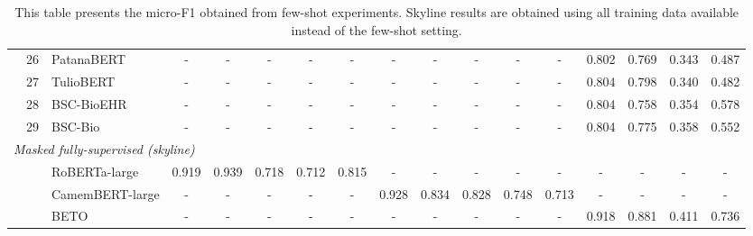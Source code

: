 \begin{table*}[ht]
{{\begin{tabular}{lll|ccccc|ccccc|cccc}
 & 26 & PatanaBERT & - & - & - & - & - & - & - & - & - & - & 0.802 & 0.769 & 0.343 & 0.487 \\
 & 27 & TulioBERT & - & - & - & - & - & - & - & - & - & - & 0.804 & 0.798 & 0.340 & 0.482 \\
 & 28 & BSC-BioEHR & - & - & - & - & - & - & - & - & - & - & 0.804 & 0.758 & 0.354 & 0.578 \\
 & 29 & BSC-Bio & - & - & - & - & - & - & - & - & - & - & 0.804 & 0.775 & 0.358 & 0.552 \\
\midrule
\midrule
\multicolumn{17}{l}{\textit{Masked fully-supervised (skyline)}} \\
\midrule
 & & RoBERTa-large & 0.919 & 0.939 & 0.718 & 0.712 & 0.815 & - & - & - & - & - & - & - & - & - \\
 & & CamemBERT-large & - & - & - & - & - & 0.928 & 0.834 & 0.828 & 0.748 & 0.713 & - & - & - & - \\
 & & BETO & - & - & - & - & - & - & - & - & - & - & 0.918 & 0.881 & 0.411 & 0.736 \\
\bottomrule
\end{tabular}}}
\caption{This table presents the micro-F1 obtained from few-shot experiments. Skyline results are obtained using all training data available instead of the few-shot setting.}
\label{tab:results}
\end{table*}
